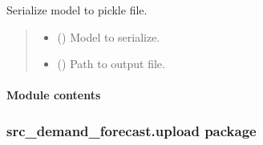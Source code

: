 \documentclass[letterpaper,10pt,english]{sphinxmanual}
\begin{document}

\begin{fulllineitems}
\label{\detokenize{src_demand_forecast.models:src_demand_forecast.models.train_model.serialize_model}}
\pysigstartsignatures
{}
\pysigstopsignatures
\sphinxAtStartPar
Serialize model to pickle file.
\begin{quote}\begin{description}
\begin{itemize}
\item {} 
\sphinxAtStartPar
{} () \textendash{} Model to serialize.

\item {} 
\sphinxAtStartPar
{} () \textendash{} Path to output file.

\end{itemize}

\end{description}\end{quote}

\end{fulllineitems}



\paragraph{Module contents}
\label{\detokenize{src_demand_forecast.models:module-src_demand_forecast.models}}\label{\detokenize{src_demand_forecast.models:module-contents}}
\sphinxstepscope


\subsubsection{src\_demand\_forecast.upload package}
\label{\detokenize{src_demand_forecast.upload:src-demand-forecast-upload-package}}\label{\detokenize{src_demand_forecast.upload::doc}}
\end{document}

